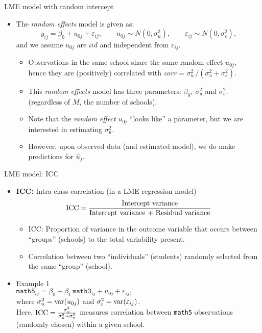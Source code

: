 \documentclass{beamer}
\begin{document}
\begin{frame}{LME model with random intercept}
\begin{itemize}
\item The \textit{random effects} model is given as:
$$ y_{ij} = \beta_{0} + u_{0j} + \varepsilon_{ij}, \qquad u_{0j} \sim N(0,\sigma^2_u), \qquad \varepsilon_{ij} \sim N(0,\sigma^2_{\varepsilon}), $$
and we assume $u_{0j}$ are $iid$ and independent from $\varepsilon_{ij}$.\\
\smallskip
\begin{itemize}
\item Observations in the same school share the same random effect $u_{0j}$,\\ hence they are (positively) correlated with \textit{corr} = $\sigma^2_u \, / (\sigma^2_u + \sigma^2_{\varepsilon})$.
\smallskip 
\item This \textit{random effects} model has three parameters: $\beta_{0},~ \sigma^2_u$ and $\sigma^2_{\varepsilon}$. (regardless of $M$, the number of schools).
\smallskip 
\item Note that the \textit{random effect} $u_{0j}$ ``looks like'' a parameter, but we are interested in estimating $\sigma^2_u$.
\smallskip 
\item However, upon observed data (and estimated model), we do make predictions for $\hat{u}_j$.
\end{itemize}
\end{itemize}
\end{frame}
\begin{frame}{LME model: ICC}
\begin{itemize}
\item \textbf{ICC:} Intra class correlation (in a LME regression model) \qquad
$$ \textnormal{ICC}=\frac{\textnormal{Intercept variance}}{\textnormal{Intercept variance + Residual variance}} $$
\begin{itemize}
    \item ICC: Proportion of variance in the outcome variable that occurs between ``groups'' (schools) to the total variability present.
    \item Correlation between two ``individuals'' (students) randomly selected from the same ``group'' (school).
\end{itemize}
\medskip
\item Example 1\\ \medskip
$\texttt{math5}_{ij} = \beta_{0} + \beta_1 \, \texttt{math3}_{ij} + u_{0j} + \varepsilon_{ij},$\\ \medskip
where $\sigma^2_u = \textnormal{var}(u_{0j})$ and $\sigma^2_{\varepsilon} = \textnormal{var}(\varepsilon_{ij})$.\\ \smallskip
Here, $\textnormal{ICC}=\frac{\sigma^2_u}{\sigma^2_u + \sigma^2_{\varepsilon}}$  measures correlation between \texttt{math5}  observations (randomly chosen) within a given school.
\end{itemize}
\end{frame}
\end{document}
